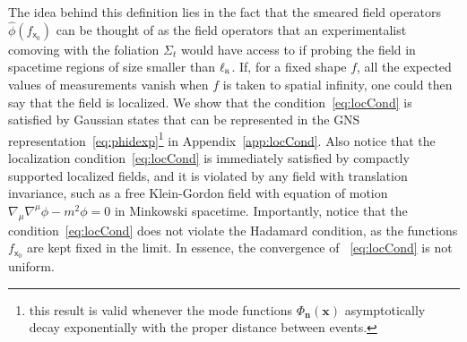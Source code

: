 \documentclass[letterpaper,12pt,titlepage,oneside,final]{book}
\newcommand{\mf}{\mathsf}%
\newcommand{\tc}[1]{\textsc{#1}}
\begin{document}
The idea behind this definition lies in the fact that the smeared field operators $\hat{\phi}({f}_{\mf x_0})$ can be thought of as the field operators that an experimentalist comoving with the foliation $\Sigma_t$ would have access to if probing the field in spacetime regions of size smaller than $\ell_\tc{r}$. If, for a fixed shape $f$, all the expected values of measurements vanish when $f$ is taken to spatial infinity, one could then say that the field is localized. We show that the condition~\eqref{eq:locCond} is satisfied by Gaussian states that can be represented in the GNS representation~\eqref{eq:phidexp}\footnote{this result is valid whenever the mode functions $\Phi_{\bm n}(\bm x)$ asymptotically decay exponentially with the proper distance between events.} in Appendix~\ref{app:locCond}. Also notice that the localization condition~\eqref{eq:locCond} is immediately satisfied by compactly supported localized fields, and it is violated by any field with translation invariance, such as a free Klein-Gordon field with equation of motion $\nabla_\mu \nabla^\mu\phi - m^2\phi = 0$ in Minkowski spacetime. Importantly, notice that the condition~\eqref{eq:locCond} does not violate the Hadamard condition, as the functions $f_{\mf x_0}$ are kept fixed in the limit. In essence, the convergence of ~\eqref{eq:locCond} is not uniform.
\end{document}
